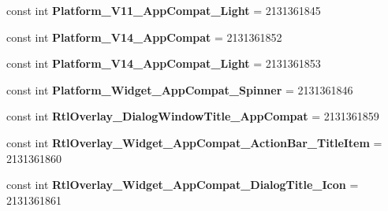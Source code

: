 \begin{DoxyCompactItemize}
\item 
\mbox{\label{class_sample_app_1_1_droid_1_1_resource_1_1_style_a07ab44e13d43d9f29e07014a93c7a5d7}} 
const int {\bfseries Platform\+\_\+\+V11\+\_\+\+App\+Compat\+\_\+\+Light} = 2131361845
\item 
\mbox{\label{class_sample_app_1_1_droid_1_1_resource_1_1_style_ab796315eddb7e4b7cda3a73baa6a5557}} 
const int {\bfseries Platform\+\_\+\+V14\+\_\+\+App\+Compat} = 2131361852
\item 
\mbox{\label{class_sample_app_1_1_droid_1_1_resource_1_1_style_adfdf97514c892d4e45b05415506fda09}} 
const int {\bfseries Platform\+\_\+\+V14\+\_\+\+App\+Compat\+\_\+\+Light} = 2131361853
\item 
\mbox{\label{class_sample_app_1_1_droid_1_1_resource_1_1_style_acceda0f1d576968ab591df3cd9fbbe53}} 
const int {\bfseries Platform\+\_\+\+Widget\+\_\+\+App\+Compat\+\_\+\+Spinner} = 2131361846
\item 
\mbox{\label{class_sample_app_1_1_droid_1_1_resource_1_1_style_a1d5cf37e9d5bb1410fcb35d7abf0fc89}} 
const int {\bfseries Rtl\+Overlay\+\_\+\+Dialog\+Window\+Title\+\_\+\+App\+Compat} = 2131361859
\item 
\mbox{\label{class_sample_app_1_1_droid_1_1_resource_1_1_style_ab6b208992147eb6bcd9a1bd784498fa1}} 
const int {\bfseries Rtl\+Overlay\+\_\+\+Widget\+\_\+\+App\+Compat\+\_\+\+Action\+Bar\+\_\+\+Title\+Item} = 2131361860
\item 
\mbox{\label{class_sample_app_1_1_droid_1_1_resource_1_1_style_ac33432fa1df18c53f8192d362693f342}} 
const int {\bfseries Rtl\+Overlay\+\_\+\+Widget\+\_\+\+App\+Compat\+\_\+\+Dialog\+Title\+\_\+\+Icon} = 2131361861
\item 
\mbox{\label{class_sample_app_1_1_droid_1_1_resource_1_1_style_a954d38c978ab50d5aa213098e8b66b2d}} 

\end{DoxyCompactItemize}
